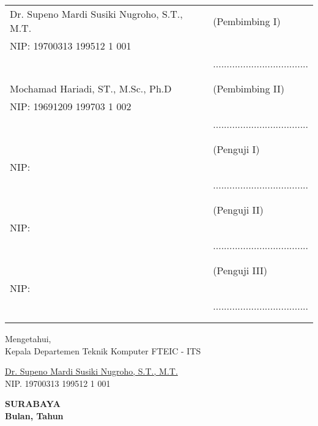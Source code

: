     \noindent
    \begin{tabularx}{\textwidth}{X l}
      Dr. Supeno Mardi Susiki Nugroho, S.T., M.T. & (Pembimbing I) \\
      NIP: 19700313 199512 1 001        & \\
      & ................................... \\
      &  \\
      &  \\
      Mochamad Hariadi, ST., M.Sc., Ph.D & (Pembimbing II) \\
      NIP: 19691209 199703 1 002        & \\
      & ................................... \\
      &  \\
      &  \\
        & (Penguji I) \\
      NIP:       & \\
      & ................................... \\
      &  \\
      &  \\
      & (Penguji II) \\
      NIP:      & \\
      & ................................... \\
      &  \\
      &  \\
                   & (Penguji III) \\
      NIP:       & \\
      & ................................... \\
      &  \\
      &  \\
    \end{tabularx}
  \endgroup


  \begin{center}
    Mengetahui, \\
    Kepala Departemen Teknik Komputer FTEIC - ITS\\

    \vspace{8ex}

    \underline{Dr. Supeno Mardi Susiki Nugroho, S.T., M.T.} \\
    NIP. 19700313 199512 1 001
  \end{center}

  \begin{center}
    \textbf{SURABAYA\\Bulan, Tahun}
  \end{center}
\endgroup
